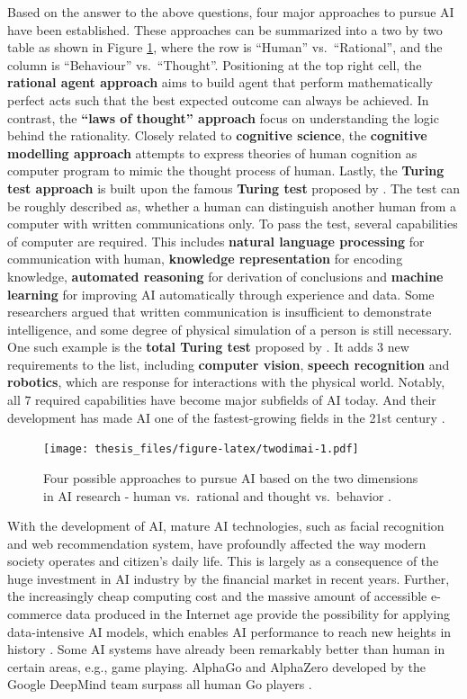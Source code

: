 \documentclass{monashthesis}
\theoremstyle{definition}
\theoremstyle{definition}
\theoremstyle{definition}
\theoremstyle{definition}
\theoremstyle{remark}
\begin{document}
Based on the answer to the above questions, four major approaches to pursue AI have been established. These approaches can be summarized into a two by two table as shown in Figure \ref{fig:twodimai}, where the row is ``Human'' vs.~``Rational'', and the column is ``Behaviour'' vs.~``Thought''. Positioning at the top right cell, the \textbf{rational agent approach} aims to build agent that perform mathematically perfect acts such that the best expected outcome can always be achieved. In contrast, the \textbf{``laws of thought'' approach} focus on understanding the logic behind the rationality. Closely related to \textbf{cognitive science}, the \textbf{cognitive modelling approach} attempts to express theories of human cognition as computer program to mimic the thought process of human. Lastly, the \textbf{Turing test approach} is built upon the famous \textbf{Turing test} proposed by \textcite{turing_computing_1950}. The test can be roughly described as, whether a human can distinguish another human from a computer with written communications only. To pass the test, several capabilities of computer are required. This includes \textbf{natural language processing} for communication with human, \textbf{knowledge representation} for encoding knowledge, \textbf{automated reasoning} for derivation of conclusions and \textbf{machine learning} for improving AI automatically through experience and data. Some researchers argued that written communication is insufficient to demonstrate intelligence, and some degree of physical simulation of a person is still necessary. One such example is the \textbf{total Turing test} proposed by \textcite{harnad_other_1991}. It adds \(3\) new requirements to the list, including \textbf{computer vision}, \textbf{speech recognition} and \textbf{robotics}, which are response for interactions with the physical world. Notably, all \(7\) required capabilities have become major subfields of AI today. And their development has made AI one of the fastest-growing fields in the 21st century \autocite{russell_artificial_2002}.

\begin{figure}
\centering
\texttt{[image: thesis\_files/figure-latex/twodimai-1.pdf]}
\caption{\label{fig:twodimai}Four possible approaches to pursue AI based on the two dimensions in AI research - human vs.~rational and thought vs.~behavior \autocite{russell_artificial_2002}.}
\end{figure}

With the development of AI, mature AI technologies, such as facial recognition and web recommendation system, have profoundly affected the way modern society operates and citizen's daily life. This is largely as a consequence of the huge investment in AI industry by the financial market in recent years. Further, the increasingly cheap computing cost and the massive amount of accessible e-commerce data produced in the Internet age provide the possibility for applying data-intensive AI models, which enables AI performance to reach new heights in history \autocite{jordan_machine_2015}. Some AI systems have already been remarkably better than human in certain areas, e.g., game playing. AlphaGo and AlphaZero developed by the Google DeepMind team surpass all human Go players \autocite{silver_general_2018}.
\end{document}
